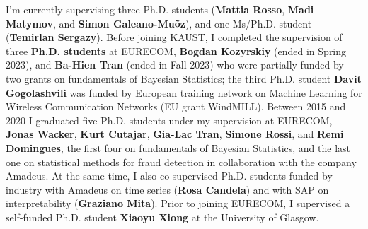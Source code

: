 \documentclass[oneside, a4paper, onecolumn, 10pt]{article}
\begin{document}
I'm currently supervising three Ph.D. students ({\bf Mattia Rosso}, {\bf Madi Matymov}, and {\bf Simon Galeano-Mu\~oz}), and one Ms/Ph.D. student ({\bf Temirlan Sergazy}). 
Before joining KAUST, I completed the supervision of three {\bf Ph.D. students} at EURECOM, {\bf Bogdan Kozyrskiy} (ended in Spring 2023), and {\bf Ba-Hien Tran} (ended in Fall 2023) who were partially funded by two grants on fundamentals of Bayesian Statistics; the third Ph.D. student {\bf Davit Gogolashvili} was funded by European training network on Machine Learning for Wireless Communication Networks (EU grant WindMILL).
Between 2015 and 2020 I graduated five Ph.D. students under my supervision at EURECOM, {\bf Jonas Wacker}, {\bf Kurt Cutajar}, {\bf Gia-Lac Tran}, {\bf Simone Rossi}, and {\bf Remi Domingues}, the first four on fundamentals of Bayesian Statistics, and the last one on statistical methods for fraud detection in collaboration with the company Amadeus. %
At the same time, I also co-supervised Ph.D. students funded by industry with Amadeus on time series ({\bf Rosa Candela}) and with SAP on interpretability ({\bf Graziano Mita}). %
Prior to joining EURECOM, I supervised a self-funded Ph.D. student {\bf Xiaoyu Xiong} at the University of Glasgow.



\end{document}
